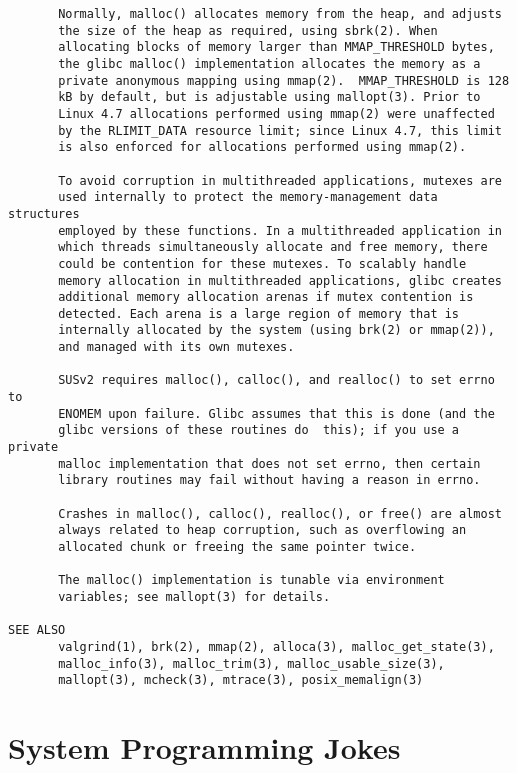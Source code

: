 {\begin{center}
\begin{verbatim}
       Normally, malloc() allocates memory from the heap, and adjusts
       the size of the heap as required, using sbrk(2). When
       allocating blocks of memory larger than MMAP_THRESHOLD bytes,
       the glibc malloc() implementation allocates the memory as a
       private anonymous mapping using mmap(2).  MMAP_THRESHOLD is 128
       kB by default, but is adjustable using mallopt(3). Prior to
       Linux 4.7 allocations performed using mmap(2) were unaffected
       by the RLIMIT_DATA resource limit; since Linux 4.7, this limit
       is also enforced for allocations performed using mmap(2). 

       To avoid corruption in multithreaded applications, mutexes are
       used internally to protect the memory-management data structures
       employed by these functions. In a multithreaded application in
       which threads simultaneously allocate and free memory, there
       could be contention for these mutexes. To scalably handle
       memory allocation in multithreaded applications, glibc creates
       additional memory allocation arenas if mutex contention is
       detected. Each arena is a large region of memory that is
       internally allocated by the system (using brk(2) or mmap(2)),
       and managed with its own mutexes. 

       SUSv2 requires malloc(), calloc(), and realloc() to set errno to
       ENOMEM upon failure. Glibc assumes that this is done (and the
       glibc versions of these routines do  this); if you use a private
       malloc implementation that does not set errno, then certain
       library routines may fail without having a reason in errno.

       Crashes in malloc(), calloc(), realloc(), or free() are almost
       always related to heap corruption, such as overflowing an
       allocated chunk or freeing the same pointer twice. 

       The malloc() implementation is tunable via environment
       variables; see mallopt(3) for details. 

SEE ALSO
       valgrind(1), brk(2), mmap(2), alloca(3), malloc_get_state(3),
       malloc_info(3), malloc_trim(3), malloc_usable_size(3),
       mallopt(3), mcheck(3), mtrace(3), posix_memalign(3)
\end{verbatim}
\end{center}
}

\section{System Programming Jokes}


